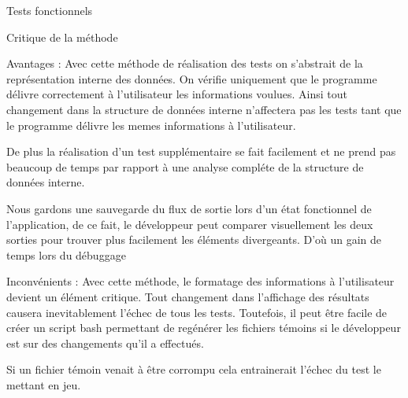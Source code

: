 \documentclass{article}
\begin{document}
\begin{section}{Tests fonctionnels}
 \begin{subsection}{Critique de la méthode}
    \begin{paragraph}{Avantages :}
      Avec cette méthode de réalisation des tests on s'abstrait de la représentation interne des données. On vérifie uniquement
      que le programme délivre correctement à l'utilisateur les informations voulues. Ainsi tout changement dans la structure de
      données interne n'affectera pas les tests tant que le programme délivre les memes informations à l'utilisateur.
      
      De plus la réalisation d'un test supplémentaire se fait facilement et ne prend pas beaucoup de temps par rapport à une analyse
      compléte de la structure de données interne.
      
      Nous gardons une sauvegarde du flux de sortie lors d'un état fonctionnel de l'application, de ce fait, le développeur peut 
      comparer visuellement les deux sorties pour trouver plus facilement les éléments divergeants. D'où un gain de temps lors du débuggage 
    \end{paragraph}

    \begin{paragraph}{Inconvénients :}
      Avec cette méthode, le formatage des informations à l'utilisateur devient un élément critique. Tout changement dans l'affichage des résultats causera
      inevitablement l'échec de tous les tests. Toutefois, il peut être facile de créer un script bash permettant de regénérer les fichiers témoins
      si le développeur est sur des changements qu'il a effectués.
      
      Si un fichier témoin venait à être corrompu cela entrainerait l'échec du test le mettant en jeu.
    \end{paragraph}
 \end{subsection}

  
\end{section}
\end{document}
